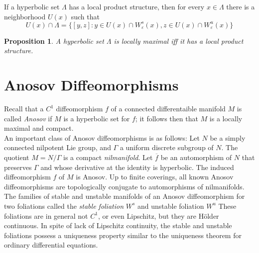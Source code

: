 \documentclass{article}
\newtheorem{prop}{Proposition}
\begin{document}
\indent If a hyperbolic set $\Lambda$ has a local product structure, then for every $x \in \Lambda$ there is a neighborhood $U(x)$ such that 
\[
U(x) \cap \Lambda = \{ [y,z] : y  \in U(x) \cap W^s_{\varepsilon}(x), z \in U(x) \cap W^u_{\varepsilon}(x) \}
\]

\begin{prop}

A hyperbolic set $\Lambda$ is locally maximal iff it has a local product structure.

\end{prop}

\section{Anosov Diffeomorphisms}

Recall that a $C^1$ diffeomorphism $f$ of a connected differentaible manifold $M$ is called \textit{Anosov} if $M$ is a hyperbolic set for $f$; it follows then that $M$ is a locally maximal and compact. \\
\indent An important class of Anosov diffeomorphisms is as follows: Let $N$ be a simply connected nilpotent Lie group, and $\Gamma$ a uniform discrete subgroup of $N$. The quotient $M = N/\Gamma$ is a compact \textit{nilmanifold}. Let $\overline{f}$ be an automorphism of $N$ that preserves $\Gamma$ and whose derivative at the identity is hyperbolic. The induced diffeomorphism $f$ of $M$ is Anosov. Up to finite coverings, all known Anosov diffeomorphisms are topologically conjugate to automorphisms of nilmanifolds.\\
\indent The families of stable and unstable manifolds of an Anosov diffeomorphism for two foliations called the \textit{stable foliation} $W^s$ and unstable foliation $W^u$ These foliations are in general not $C^1$, or even Lipschitz, but they are H\"older continuous. In spite of lack of Lipschitz continuity, the stable and unstable foliations possess a uniqueness property similar to the uniqueness theorem for ordinary differential equations. \\
\end{document}
